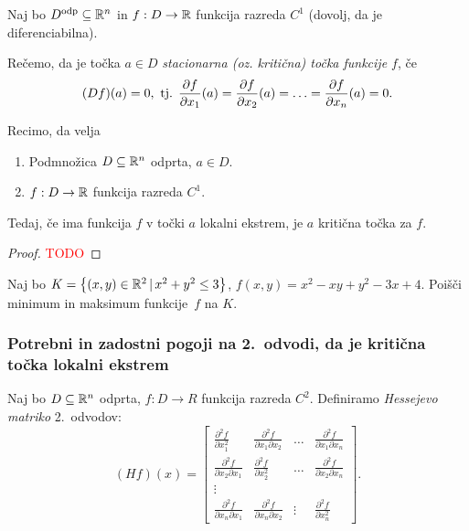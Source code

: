 \begin{definicija}
    Naj bo $D^\text{odp} \subseteq \mathbb{R}^n$ in $f: D \to \mathbb{R}$ funkcija razreda $C^1$ (dovolj, da je diferenciabilna). 
    
    Rečemo, da je točka $a \in D$ \emph{stacionarna (oz. kritična) točka  funkcije $f$}, če $$(Df)(a) = 0, \text{ tj. } \frac{\partial f}{\partial x_1}(a) = \frac{\partial f}{\partial x_2}(a) = \ldots = \frac{\partial f}{\partial x_n}(a) = 0.$$
\end{definicija}

\begin{trditev}
    Recimo, da velja
    \begin{enumerate}
        \item Podmnožica $D \subseteq \mathbb{R}^n$ odprta, $a \in D$.
        \item $f: D \to \mathbb{R}$ funkcija razreda $C^1$.
    \end{enumerate}
    Tedaj, če ima funkcija $f$ v točki $a$ lokalni ekstrem, je $a$ kritična točka za $f$.
\end{trditev}

\begin{proof}
    \textcolor{red}{TODO}
\end{proof}

\begin{zgled}
    Naj bo $K = \left\{(x, y) \in \mathbb{R}^2 \,|\, x^2+y^2 \leq 3\right\}$, $f(x, y) = x^2 - xy + y^2 - 3x +4$. 
    Poišči minimum in maksimum funkcije~$f$ na $K$.
\end{zgled}

\subsubsection{Potrebni in zadostni pogoji na 2.\ odvodi, da je kritična točka lokalni ekstrem}
Naj bo $D \subseteq \mathbb{R}^n$ odprta, $f: D \to R$ funkcija razreda $C^2$. Definiramo \emph{Hessejevo matriko} 2.\ odvodov:
$$(Hf) (x) = \begin{bmatrix}
    \frac{\partial^2 f}{\partial x_1^2} & \frac{\partial^2 f}{\partial x_1 \partial x_2} & \ldots & \frac{\partial^2 f}{\partial x_1 \partial x_n} \\
    \frac{\partial^2 f}{\partial x_2 \partial x_1} & \frac{\partial^2 f}{\partial x_2^2} & \ldots & \frac{\partial^2 f}{\partial x_2 \partial x_n} \\
    \vdots & & & \\
    \frac{\partial^2 f}{\partial x_n \partial x_1} & \frac{\partial^2 f}{\partial x_n \partial x_2} & \vdots & \frac{\partial^2 f}{\partial x_n^2}
\end{bmatrix}.$$

